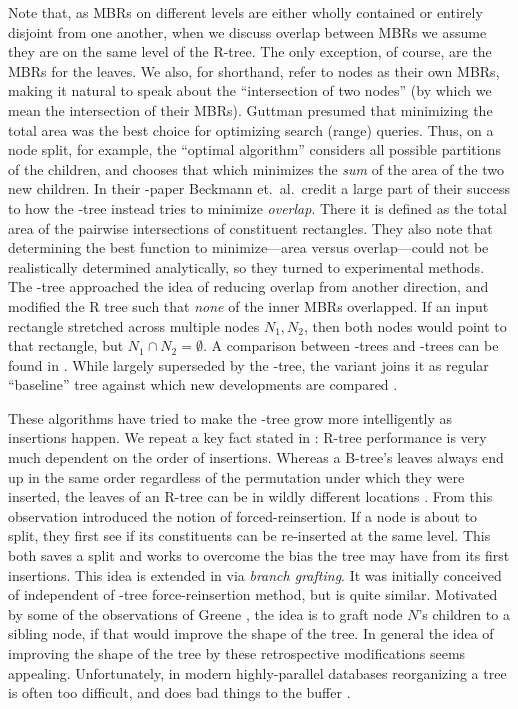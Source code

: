 Note that, as MBRs on different levels are either wholly contained or entirely disjoint from one another, when we discuss overlap between MBRs we assume they are on the same level of the R-tree.
The only exception, of course, are the MBRs for the leaves.
We also, for shorthand, refer to nodes as their own MBRs, making it natural to speak about the ``intersection of two nodes'' (by which we mean the intersection of their MBRs).
Guttman \cite{guttman84} presumed that minimizing the total area was the best choice for optimizing search (range) queries.
Thus, on a node split, for example, the ``optimal algorithm'' considers all possible partitions of the children, and chooses that which minimizes the \emph{sum} of the area of the two new children.
In their \rstar-paper \cite{beckmannkriegelschneiderseeger90} Beckmann et.\ al.\ credit a large part of their success to how the \rstar-tree instead tries to minimize \emph{overlap}.
There it is defined as the total area of the pairwise intersections of constituent rectangles.
They also note that determining the best function to minimize---area versus overlap---could not be realistically determined analytically, so they turned to experimental methods.
The \rplus-tree \cite{sellisroussopoulosfaloutsos87} approached the idea of reducing overlap from another direction, and modified the R tree such that \emph{none} of the inner MBRs overlapped.
If an input rectangle stretched across multiple nodes $N_1,N_2$, then both nodes would point to that rectangle, but $N_1\cap N_2=\emptyset$.
A comparison between \rbase-trees and \rplus-trees can be found in \cite{greene89}.
While largely superseded by the \rstar-tree, the \rplus variant joins it as regular ``baseline'' tree against which new developments are compared \cite{something}.

These algorithms have tried to make the \rbase-tree grow more intelligently as insertions happen.
We repeat a key fact stated in \cite{beckmannkriegelschneiderseeger90}: R-tree performance is very much dependent on the order of insertions.
Whereas a B-tree's leaves always end up in the same order regardless of the permutation under which they were inserted, the leaves of an R-tree can be in wildly different locations \cite{tocite,tocite}.
From this observation \cite{beckmannkriegelschneiderseeger90} introduced the notion of forced-reinsertion.
If a node is about to split, they first see if its constituents can be re-inserted at the same level.
This both saves a split and works to overcome the bias the tree may have from its first insertions.
This idea is extended in \cite{schrekchen00} via \emph{branch grafting}.
It was initially conceived of independent of \rstar-tree force-reinsertion method, but is quite similar.
Motivated by some of the observations of Greene \cite{greene89}, the idea is to graft node $N$'s children to a sibling node, if that would improve the shape of the tree.
In general the idea of improving the shape of the tree by these retrospective modifications seems appealing.
Unfortunately, in modern highly-parallel databases reorganizing a tree is often too difficult, and does bad things to the buffer \cite{beckmannseeger09}.

